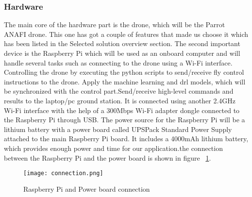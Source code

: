 \documentclass[../main.tex]{subfiles}
\begin{document}
\subsubsection{Hardware}
The main core of the hardware part is the drone, which will be the Parrot ANAFI drone. This one has got a couple of features that made us choose it which has been listed in the Selected solution overview section. The second important device is the Raspberry Pi which will be used as an onboard computer and will handle several tasks such as connecting to the drone using a Wi-Fi interface. Controlling the drone by executing the python scripts to send/receive fly control instructions to the drone. Apply the machine learning and \gls{drl} models, which will be synchronized with the control part.Send/receive high-level commands and results to the laptop/pc ground station. It is connected using another 2.4GHz Wi-Fi interface with the help of a 300Mbps Wi-Fi adapter dongle connected to the Raspberry Pi through USB. The power source for the Raspberry Pi will be a lithium battery with a power board called UPSPack Standard Power Supply attached to the main Raspberry Pi board. It includes a 4000mAh lithium battery, which provides enough power and time for our application.the connection between the Raspberry Pi and the power board is shown in figure ~\ref{Fig3:connection}.
\begin{figure}[H]
	\centering
	\texttt{[image: connection.png]}
	\caption{Raspberry Pi and Power board connection}\label{Fig3:connection}
\end{figure}     
\end{document}
